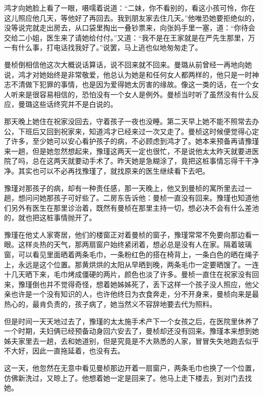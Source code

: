 \par 鸿才向她脸上看了一眼，嗫嚅着说道：“二妹，你不看别的，看这小孩可怜，你在这儿照应他几天，等他好了再回去。我到朋友家去住几天。”他唯恐她要拒绝似的，没等说完就走出房去，从口袋里掏出一叠钞票来，向张妈手里一塞，道：“你待会交给二小姐，医生来了请她给付付。”又道：“我不是在王家就是在严先生那里，万一有什么事，打电话找我好了。”说罢，马上逃也似地匆匆走了。
\par 曼桢倒相信他这次大概说话算话，说不回来就不回来。曼璐从前曾经一再地向她说，鸿才对她始终是非常敬爱，他总认为她是和任何女人都两样的，他只是一时神志不清做下犯罪的事情，也是因为爱得她太厉害的缘故。像这一类的话，在一个女人听来是很容易相信的，恐怕没有一个女人是例外。曼桢当时听了虽然没有什么反应，曼璐这些话终究并不是白说的。
\par 那天晚上她住在祝家没回去，守着孩子一夜也没睡。第二天早上她不能不照常去办公，下班后又回到祝家来，知道鸿才已经来过一次又走了。曼桢这时候便觉得心定了许多，至少她可以安心看护孩子的病，不必顾虑到鸿才了。她本来预备再请豫瑾来一趟，但是她忽然想起来，豫瑾这两天一定也很忙，不是说他太太昨天就要进医院了吗，总在这两天就要动手术了。昨天她是急糊涂了，竟把这桩事情忘得干干净净。其实也可以不必再找豫瑾了，就找原来的医生继续看下去吧。
\par 豫瑾对那孩子的病，却有一种责任感，那一天晚上，他又到曼桢的寓所里去过一趟，想问问她那孩子可好些了。二房东告诉他：曼桢一直没有回来。豫瑾也知道他们另外有医生在那里诊治着，既然有曼桢在那里主持一切，想必决不会有什么差池的，就也把这桩事情抛开了。
\par 豫瑾在他丈人家寄居，他们的楼窗正对着曼桢的窗子，豫瑾常常不免要向那边看一眼。这样炎热的天气，那两扇窗户始终紧闭着，想必总是没有人在家。隔着玻璃窗，可以看见里面晒着两条毛巾，一条粉红色的搭在椅背上，一条白色的晒在绳子上，永远是这个位置。那黄烘烘的太阳从早晒到晚，两条毛巾一定要晒馊了。一连十几天晒下来，毛巾烤成僵硬的两片，颜色也淡了许多。曼桢一直住在祝家没有回来，豫瑾倒也并不觉得奇怪，想着她姊姊死了，丢下这样一个孩子没人照应，他父亲也许是一个没有知识的人，也许他终日为衣食奔走，分不开身来，曼桢向来是最热心的，最肯负责的，孩子病了，她当然义不容辞地要去代为照料。
\par 但是时间一天天地过去了，豫瑾的太太施手术产下一个女孩之后，在医院里休养了一个时期，夫妇俩已经预备动身回六安去了，曼桢却还没有回来。豫瑾本来想到她姊夫家里去一趟，去和她道别，但是究竟是不大熟悉的人家，冒冒失失地跑去似乎不大好，因此一直拖延着，也没有去。
\par 这一天，他忽然在无意中看见曼桢那边开着一扇窗户，两条毛巾也换了一个位置，仿佛新洗过，又晾上了。他想着她一定是回来了。他马上走下楼去，到对门去找她。
